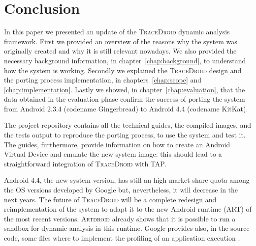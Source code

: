 \chapter{Conclusion}
\label{chap:conclusions}

In this paper we presented an update of the \textsc{TraceDroid} dynamic
analysis framework. First we provided an overview of the reasons why
the system was originally created and why it is still relevant
nowadays. We also provided the necessary background information, in chapter~\ref{chap:background}, to
understand how the system is working. Secondly we explained the
\textsc{TraceDroid} design and the porting process implementation, in chapters~\ref{chap:scope} and \ref{chap:implementation}. Lastly we
showed, in chapter~\ref{chap:evaluation}, that the data obtained in the evaluation phase confirm the
success of porting the system from Android 2.3.4 (codename
Gingerbread) to Android 4.4 (codename KitKat).

The project repository \cite{ref15} contains all the technical guides, the
compiled images, and the tests output to reproduce the porting
process, to use the system and test it. The guides, furthermore,
provide information on how to create an Android Virtual Device and
emulate the new system image: this should lead to a straightforward
integration of \textsc{TraceDroid} with \textsc{TAP}.

Android 4.4, the new system version, has still an high market share
quota among the OS versions developed by Google but, nevertheless, it
will decrease in the next years. The future of \textsc{TraceDroid} will be a
complete redesign and reimplementation of the system to adapt it to
the new Android runtime (ART) of the most recent versions. \textsc{Artdroid}
\cite{ref28} already shows that it is possible to run a sandbox for dynamic
analysis in this runtime. Google provides also, in the source code,
some files where to implement the profiling of an application
execution \cite{ref29}.
